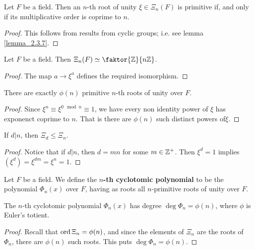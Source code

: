 \begin{proposition}\label{proposition_8.7.3}
  Let $F$ be a field. Then an $n$-th root of unity $\xi \in \Xi_n(F)$
  is primitive if, and only if its multiplicative order is coprime to
  $n$.
\end{proposition}
\begin{proof}
  This follows from results from cyclic groups; i.e. see lemma
  \ref{lemma_2.3.7}.
\end{proof}

\begin{proposition}\label{proposition_8.7.4}
  Let $F$ be a field. Then $\Xi_n(F) \simeq \faktor{\Z}{n\Z}$.
\end{proposition}
\begin{proof}
  The map $a \xrightarrow{} \xi^a$ defines the required isomorphism.
\end{proof}
\begin{corollary}
  There are exactly $\phi(n)$ primitive $n$-th roots of unity over
  $F$.
\end{corollary}
\begin{proof}
  Since $\xi^n \equiv \xi^{0 \mod{n}} \equiv 1$, we have every non identity
  power of $\xi$ has exponenct coprime to  $n$. That is there are $\phi(n)$
  such distinct powers of$\xi$.
\end{proof}
\begin{corollary}
  If $d|n$, then  $\Xi_d \leq \Xi_n$.
\end{corollary}
\begin{proof}
  Notice that if $d|n$, then $d=mn$ for some  $m \in \mathbb{Z}^+$. Then $\xi^d=1$
  implies  $(\xi^d)=\xi^{dm}=\xi^n=1$.
\end{proof}

\begin{definition}
  Let $F$ be a field. We define the \textbf{$n$-th cyclotomic
  polynomial} to be the polynomial $\Phi_n(x)$ over $F$,
  having as roots all $n$-primitive roots of unity over $F$.
\end{definition}

\begin{proposition}\label{proposition_8.7.5}
  The $n$-th cyclotomic polynomial  $\Phi_n(x)$ has degree
  $\deg{\Phi_n}=\phi(n)$, where $\phi$ is Euler's totient.
\end{proposition}
\begin{proof}
  Recall that $\operatorname{ord}{\Xi_n}=\phi(n)$, and since the elements of $\Xi_n$ are the
  roots of  $\Phi_n$, there are  $\phi(n)$ such roots. This puts
  $\deg{\Phi_n}=\phi(n)$.
\end{proof}

